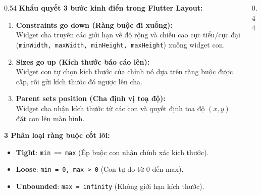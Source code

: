 \documentclass[aspectratio=169, 10pt]{beamer}
\newcommand{\SlideHeader}[2]{%
  \noindent{\textcolor{AccentOrange}{\textbf{\footnotesize #1}}}\\[0.08cm]
  \noindent{\Large \textbf{\textcolor{NavyTitle}{#2}}}\\[0.22cm]
}
\begin{document}
\begin{frame}
  \SlideHeader{CƠ SỞ LÝ THUYẾT}{Nguyên Lý Ràng Buộc Hộp: "Box Constraints"}

  \begin{columns}[T]
    \begin{column}{0.54\textwidth}
      \textbf{Khẩu quyết 3 bước kinh điển trong Flutter Layout:}
      \begin{enumerate}
        \item \textbf{Constraints go down (Ràng buộc đi xuống):}\\
        Widget cha truyền các giới hạn về độ rộng và chiều cao cực tiểu/cực đại (\texttt{minWidth, maxWidth, minHeight, maxHeight}) xuống widget con.
        \item \textbf{Sizes go up (Kích thước báo cáo lên):}\\
        Widget con tự chọn kích thước của chính nó dựa trên ràng buộc được cấp, rồi gửi kích thước đó ngược lên cha.
        \item \textbf{Parent sets position (Cha định vị toạ độ):}\\
        Widget cha nhận kích thước từ các con và quyết định toạ độ $(x, y)$ đặt con lên màn hình.
      \end{enumerate}
      \vspace{0.1cm}
      \textbf{3 Phân loại ràng buộc cốt lõi:}
      \begin{itemize}
        \item \textbf{Tight}: \texttt{min == max} (Ép buộc con nhận chính xác kích thước).
        \item \textbf{Loose}: \texttt{min = 0, max > 0} (Con tự do từ 0 đến max).
        \item \textbf{Unbounded}: \texttt{max = infinity} (Không giới hạn kích thước).
      \end{itemize}
    \end{column}

    \begin{column}{0.44\textwidth}
      \centering
\end{column}
\end{columns}
\end{frame}
\end{document}
